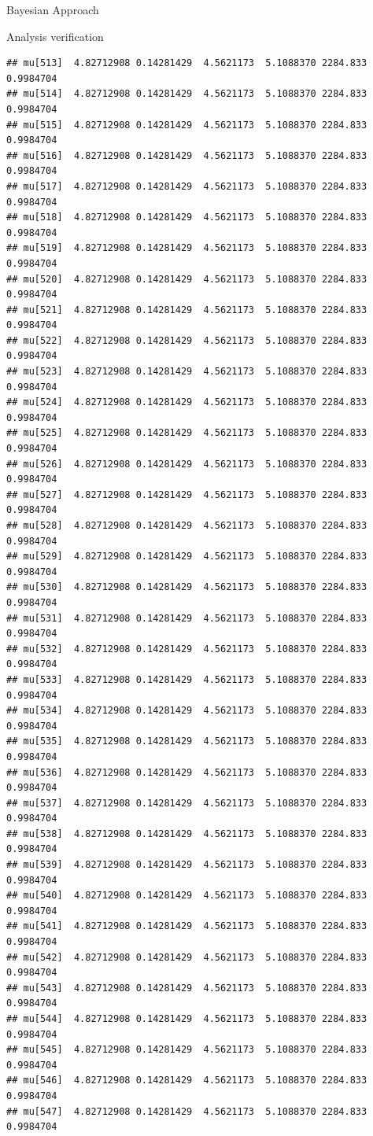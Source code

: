 \documentclass[
  ignorenonframetext,
]{beamer}
\begin{document}
\begin{frame}[fragile]{Bayesian Approach}
\begin{block}{Analysis verification}
\begin{verbatim}
## mu[513]  4.82712908 0.14281429  4.5621173  5.1088370 2284.833 0.9984704
## mu[514]  4.82712908 0.14281429  4.5621173  5.1088370 2284.833 0.9984704
## mu[515]  4.82712908 0.14281429  4.5621173  5.1088370 2284.833 0.9984704
## mu[516]  4.82712908 0.14281429  4.5621173  5.1088370 2284.833 0.9984704
## mu[517]  4.82712908 0.14281429  4.5621173  5.1088370 2284.833 0.9984704
## mu[518]  4.82712908 0.14281429  4.5621173  5.1088370 2284.833 0.9984704
## mu[519]  4.82712908 0.14281429  4.5621173  5.1088370 2284.833 0.9984704
## mu[520]  4.82712908 0.14281429  4.5621173  5.1088370 2284.833 0.9984704
## mu[521]  4.82712908 0.14281429  4.5621173  5.1088370 2284.833 0.9984704
## mu[522]  4.82712908 0.14281429  4.5621173  5.1088370 2284.833 0.9984704
## mu[523]  4.82712908 0.14281429  4.5621173  5.1088370 2284.833 0.9984704
## mu[524]  4.82712908 0.14281429  4.5621173  5.1088370 2284.833 0.9984704
## mu[525]  4.82712908 0.14281429  4.5621173  5.1088370 2284.833 0.9984704
## mu[526]  4.82712908 0.14281429  4.5621173  5.1088370 2284.833 0.9984704
## mu[527]  4.82712908 0.14281429  4.5621173  5.1088370 2284.833 0.9984704
## mu[528]  4.82712908 0.14281429  4.5621173  5.1088370 2284.833 0.9984704
## mu[529]  4.82712908 0.14281429  4.5621173  5.1088370 2284.833 0.9984704
## mu[530]  4.82712908 0.14281429  4.5621173  5.1088370 2284.833 0.9984704
## mu[531]  4.82712908 0.14281429  4.5621173  5.1088370 2284.833 0.9984704
## mu[532]  4.82712908 0.14281429  4.5621173  5.1088370 2284.833 0.9984704
## mu[533]  4.82712908 0.14281429  4.5621173  5.1088370 2284.833 0.9984704
## mu[534]  4.82712908 0.14281429  4.5621173  5.1088370 2284.833 0.9984704
## mu[535]  4.82712908 0.14281429  4.5621173  5.1088370 2284.833 0.9984704
## mu[536]  4.82712908 0.14281429  4.5621173  5.1088370 2284.833 0.9984704
## mu[537]  4.82712908 0.14281429  4.5621173  5.1088370 2284.833 0.9984704
## mu[538]  4.82712908 0.14281429  4.5621173  5.1088370 2284.833 0.9984704
## mu[539]  4.82712908 0.14281429  4.5621173  5.1088370 2284.833 0.9984704
## mu[540]  4.82712908 0.14281429  4.5621173  5.1088370 2284.833 0.9984704
## mu[541]  4.82712908 0.14281429  4.5621173  5.1088370 2284.833 0.9984704
## mu[542]  4.82712908 0.14281429  4.5621173  5.1088370 2284.833 0.9984704
## mu[543]  4.82712908 0.14281429  4.5621173  5.1088370 2284.833 0.9984704
## mu[544]  4.82712908 0.14281429  4.5621173  5.1088370 2284.833 0.9984704
## mu[545]  4.82712908 0.14281429  4.5621173  5.1088370 2284.833 0.9984704
## mu[546]  4.82712908 0.14281429  4.5621173  5.1088370 2284.833 0.9984704
## mu[547]  4.82712908 0.14281429  4.5621173  5.1088370 2284.833 0.9984704

\end{verbatim}
\end{block}
\end{frame}
\end{document}
